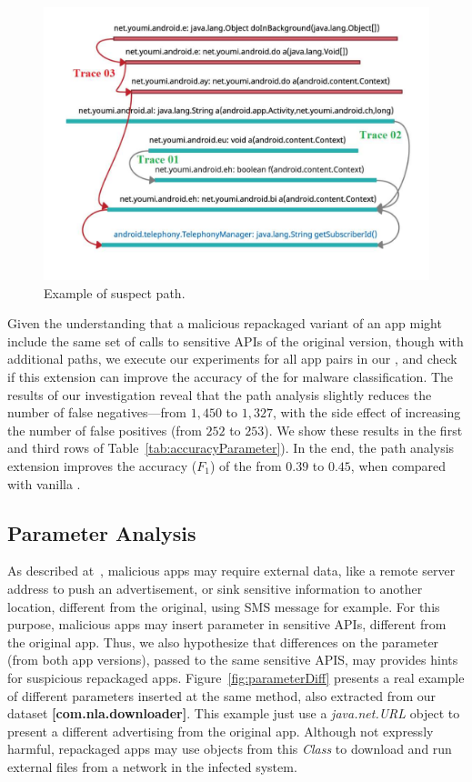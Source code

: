 \begin{figure}
\centering
\includegraphics[scale=0.28]{images/maliciousTrace_example01.pdf}
\caption{Example of suspect path.}
 \label{fig:maliciousTrace}
\end{figure}

Given the understanding that a malicious repackaged variant of an app
might include the same set of calls to sensitive APIs of the original version, though with additional
paths, we execute our experiments for all app pairs in our \cds, and check if this extension can
improve the accuracy of the \mas for malware classification. 
The results of our investigation reveal that the path analysis slightly reduces the number of false negatives---from $1,450$ to $1,327$,
with the side effect of increasing the number of false positives (from $252$ to $253$). We show these
results in the first and third rows of Table~\ref{tab:accuracyParameter}). In the end, the path analysis extension
improves the accuracy ($F_1$) of the \mas from $0.39$ to $0.45$, when compared with vanilla \mas.


\subsection{Parameter Analysis}

As described at~\cite{le2018towards}, malicious apps may require external data, like a remote server address to push an advertisement, or sink sensitive information to another location, different from the original, using SMS message for example. For this purpose, malicious apps may insert parameter in sensitive APIs, different from the original app. Thus, we also hypothesize that differences on the parameter (from both app versions), passed to the same sensitive APIS, may provides hints for suspicious repackaged apps. Figure~\ref{fig:parameterDiff} presents a real example of different parameters inserted at the same method, also extracted from our dataset \textbf{[com.nla.downloader]}. This example just use a \textit{java.net.URL} object to present a different advertising from the original app. Although not expressly harmful, repackaged apps may use objects from this \textit{Class} to download and run external files from a network in the infected system\cite{DBLP:journals/compsec/ObaidatSPP22}.

